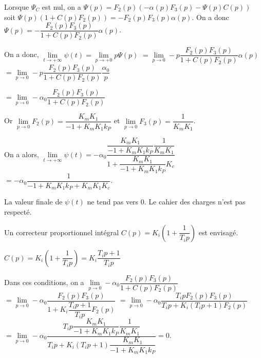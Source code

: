 \ifprof
\begin{corrige}
Lorsque $\Psi_C$ est nul, on a $\Psi (p)=F_2(p)\left( -\alpha(p) F_3(p)-\Psi(p) C(p) \right)$
soit $\Psi (p)\left(1+C(p)F_2(p)\right)=-F_2(p)  F_3(p) \alpha(p) $. On a donc
$\Psi (p)=-\dfrac{F_2(p)  F_3(p)}{1+C(p)F_2(p)} \alpha(p) $.

On a donc, $\lim\limits_{t \to +\infty} \psi (t) =\lim\limits_{p \to +0} p \Psi (p)$
$=\lim\limits_{p \to 0}  -p\dfrac{F_2(p)  F_3(p)}{1+C(p)F_2(p)} \alpha(p)$
$=\lim\limits_{p \to 0} -p\dfrac{F_2(p)  F_3(p)}{1+C(p)F_2(p)} \dfrac{\alpha_0}{p}$

$=\lim\limits_{p \to 0} -\alpha_0\dfrac{F_2(p)  F_3(p)}{1+C(p)F_2(p)} $

Or $\lim\limits_{p \to 0} F_2(p) =\dfrac{K_m K_1}{-1+K_m K_1k_P}$ et 
$\lim\limits_{p \to 0} F_3(p) =\dfrac{1}{K_mK_1}$.

On a  alors, 
$\lim\limits_{t \to +\infty} \psi (t) = -\alpha_0\dfrac{\dfrac{K_m K_1}{-1+K_m K_1k_P}\dfrac{1}{K_mK_1}}{1+\dfrac{K_m K_1}{-1+K_m K_1k_P} K_c}$
$= -\alpha_0\dfrac{1}{-1+K_m K_1k_P+K_m K_1 K_c}$.

La valeur finale de $\psi(t)$ ne tend pas vers 0. Le cahier des charges n'est pas respecté.


\end{corrige}
\else
\fi

Un correcteur proportionnel intégral $C(p)=K_i \left(1+\dfrac{1}{T_i p}\right)$ est envisagé.

\ifprof
\begin{corrige}
$C(p)=K_i \left(1+\dfrac{1}{T_i p}\right) = K_i \dfrac{T_i p+1}{T_i p}$

Dans ces conditions, on a 
$\lim\limits_{p \to 0} -\alpha_0\dfrac{F_2(p)  F_3(p)}{1+C(p)F_2(p)} $
$ = \lim\limits_{p \to 0} -\alpha_0\dfrac{F_2(p)  F_3(p)}{1+K_i \dfrac{T_i p+1}{T_i p}F_2(p)} $
$ = \lim\limits_{p \to 0} -\alpha_0\dfrac{T_i p F_2(p)  F_3(p)}{T_i p+K_i \left(T_i p+1\right)F_2(p)} $
$ = \lim\limits_{p \to 0} -\alpha_0\dfrac{T_i p \dfrac{K_m K_1}{-1+K_m K_1k_P}  \dfrac{1}{K_mK_1}}{T_i p+K_i \left(T_i p+1\right)\dfrac{K_m K_1}{-1+K_m K_1k_P}}  = 0$.
\end{corrige}
\else
\fi


